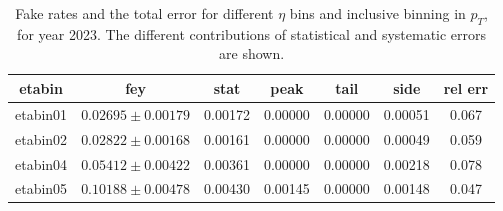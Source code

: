 
\begin{table}
  \centering
  \begin{tabular}{|c|c|c|c|c|c|c|} \hline
    etabin & fey & stat & peak & tail & side & rel err  \\ \hline
etabin01 & $0.02695 \pm 0.00179$ & 0.00172  & 0.00000  & 0.00000  & 0.00051 & 0.067 \\
etabin02 & $0.02822 \pm 0.00168$ & 0.00161  & 0.00000  & 0.00000  & 0.00049 & 0.059 \\
etabin04 & $0.05412 \pm 0.00422$ & 0.00361  & 0.00000  & 0.00000  & 0.00218 & 0.078 \\
etabin05 & $0.10188 \pm 0.00478$ & 0.00430  & 0.00145  & 0.00000  & 0.00148 & 0.047 \\
    \hline
  \end{tabular}
  \caption{Fake rates and the total error for different $\eta$ bins and inclusive binning in $p_T$, for year 2023. The different contributions of statistical and systematic errors are shown.}
  \label{tab:efy-results-2023}
\end{table}


